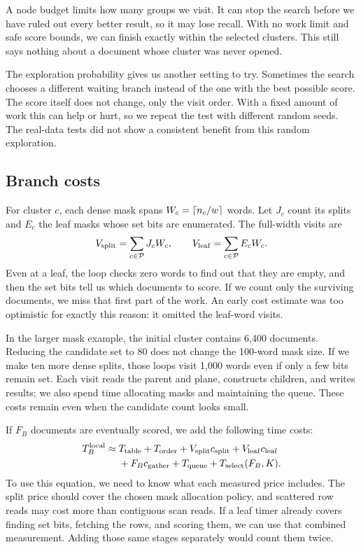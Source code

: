 A node budget limits how many groups we visit. It can stop the search before we have ruled
out every better result, so it may lose recall. With no work limit and safe score bounds,
we can finish exactly within the selected clusters. This still says nothing about a document
whose cluster was never opened.

The exploration probability gives us another setting to try. Sometimes the search chooses
a different waiting branch instead of the one with the best possible score. The score itself
does not change, only the visit order. With a fixed amount of work this can help or hurt,
so we repeat the test with different random seeds. The real-data tests did not show a
consistent benefit from this random exploration.

\subsection{Branch costs}
For cluster $c$, each dense mask spans $W_c=\left\lceil n_c/w\right\rceil$ words. Let $J_c$ count its splits
and $E_c$ the leaf masks whose set bits are enumerated. The full-width visits are
\begin{equation}
V_{\rm split}=\sum_{c\in\mathcal P}J_cW_c,
\qquad V_{\rm leaf}=\sum_{c\in\mathcal P}E_cW_c.
\label{eq:visits}
\end{equation}
Even at a leaf, the loop checks zero words to find out that they are empty, and then the set
bits tell us which documents to score. If we count only the surviving documents, we miss that
first part of the work. An early cost estimate was too optimistic for exactly this reason:
it omitted the leaf-word visits.

In the larger mask example, the initial cluster contains 6,400 documents. Reducing the
candidate set to 80 does not change the 100-word mask size. If we make ten more dense splits, those loops
visit 1,000 words even if only a few bits remain set. Each visit reads the parent and plane,
constructs children, and writes results; we also spend time allocating masks and maintaining
the queue. These costs remain even when the candidate count looks small.

If $F_B$ documents are eventually scored, we add the following time costs:
\begin{equation}
\begin{split}
T_B^{\rm local}\approx{}&T_{\rm table}+T_{\rm order}
 +V_{\rm split}c_{\rm split}+V_{\rm leaf}c_{\rm leaf}\\
 &+F_Bc_{\rm gather}+T_{\rm queue}+T_{\rm select}(F_B,K).
\end{split}
\label{eq:branch-time}
\end{equation}
To use this equation, we need to know what each measured price includes. The split price
should cover the chosen mask allocation policy, and scattered row reads may cost more than
contiguous scan reads. If a leaf timer already covers finding set bits, fetching the rows,
and scoring them, we can use that combined measurement. Adding those same stages separately
would count them twice.

